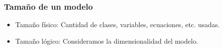 \documentclass[aspectratio=169,10pt]{beamer}
\begin{document}
\begin{frame}[fragile]
\frametitle{Tama\~no de un modelo} 
\begin{itemize}
    \item Tamaño físico: Cantidad de clases, variables, ecuaciones, etc. usadas.
    \item Tamaño lógico: Consideramos la dimensionalidad del modelo.
\end{itemize}
 
\end{frame}




\end{document}
